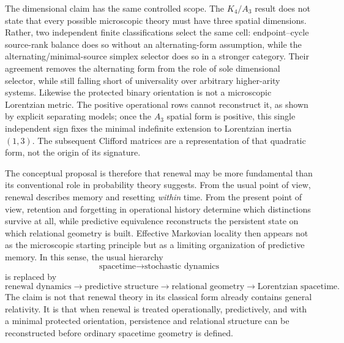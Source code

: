 \documentclass[11pt]{article}
\numberwithin{equation}{section}
\theoremstyle{definition}
\theoremstyle{remark}
\begin{document}
The dimensional claim has the same controlled scope.  The $K_4/A_3$ result
does not state that every possible microscopic theory must have three spatial
dimensions.  Rather, two independent finite classifications select the same
cell: endpoint--cycle source-rank balance does so without an alternating-form
assumption, while the alternating/minimal-source simplex selector does so in a
stronger category.  Their agreement removes the alternating form from the role
of sole dimensional selector, while still falling short of universality over
arbitrary higher-arity systems.  Likewise the protected binary orientation is
not a microscopic Lorentzian metric.  The positive operational rows cannot
reconstruct it, as shown by explicit separating models; once the $A_3$ spatial
form is positive, this single independent sign fixes the minimal indefinite
extension to Lorentzian inertia $(1,3)$.  The subsequent Clifford matrices are
a representation of that quadratic form, not the origin of its signature.

The conceptual proposal is therefore that renewal may be more fundamental
than its conventional role in probability theory suggests.  From the usual
point of view, renewal describes memory and resetting \emph{within} time.  From
the present point of view, retention and forgetting in operational history
determine which distinctions survive at all, while predictive equivalence
reconstructs the persistent state on which relational geometry is built.
Effective Markovian locality then appears not as the microscopic starting
principle but as a limiting organization of predictive memory.  In this sense,
the usual hierarchy
\begin{equation}
\boxed{\text{spacetime}\longrightarrow\text{stochastic dynamics}}
\end{equation}
is replaced by
\begin{equation}
\boxed{
\text{renewal dynamics}
\longrightarrow
\text{predictive structure}
\longrightarrow
\text{relational geometry}
\longrightarrow
\text{Lorentzian spacetime}.}
\end{equation}
The claim is not that renewal theory in its classical form already contains
general relativity.  It is that when renewal is treated operationally,
predictively, and with a minimal protected orientation, persistence and
relational structure can be reconstructed before ordinary spacetime geometry
is defined.
\end{document}
